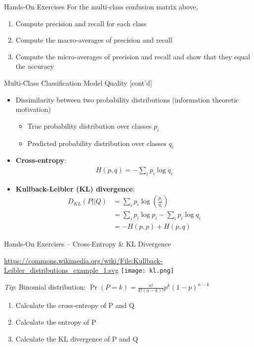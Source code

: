 \documentclass[ignorenonframetext,xcolor=x11names]{beamer}
\begin{document}
\begin{frame}{Hands-On Exercises}
For the multi-class confusion matrix above,
\begin{enumerate}
  \item Compute precision and recall for each class
  \item Compute the macro-averages of precision and recall
  \item Compute the micro-averages of precision and recall and show that they equal the accuracy
\end{enumerate}
\end{frame}

\begin{frame}{Multi-Class Classification Model Quality \small [cont'd]}
\begin{itemize}
  \item Dissimilarity between two probability distributions (information theoretic motivation)
  \begin{itemize}
     \item True probability distribution over classes $p_i$
     \item Predicted probability distribution over classes $q_i$
  \end{itemize}
  \item \textbf{Cross-entropy}: 
\begin{align*}
H(p, q) = - \sum_i p_i \log q_i
\end{align*}
  \item \textbf{Kullback-Leibler (KL) divergence}:
\begin{align*}
D_{KL}(P || Q) &= \sum_i p_i \log \left( \frac{p_i}{q_i} \right) \\
  & = \sum_i p_i \log p_i - \sum_i p_i \log q_i \\
  & = - H(p, p) + H(p, q)
\end{align*}
\end{itemize}
\end{frame}

\begin{frame}{Hands-On Exercises -- Cross-Entropy \& KL Divergence}
\begin{center}
\vspace{-3mm} \tiny \url{https://commons.wikimedia.org/wiki/File:Kullback-Leibler_distributions_example_1.svg}
\normalsize
\texttt{[image: kl.png]} \\
\end{center}

\vspace{-8mm}
\emph{Tip}: Binomial distribution: $\Pr(P=k) = \frac{n!}{k!(n-k)!} p^k (1-p)^{n-k}$ \\

\begin{enumerate}
   \item Calculate the cross-entropy of P and Q
   \item Calculate the entropy of P
   \item Calculate the KL divergence of P and Q
\end{enumerate}
\end{frame}
\end{document}
